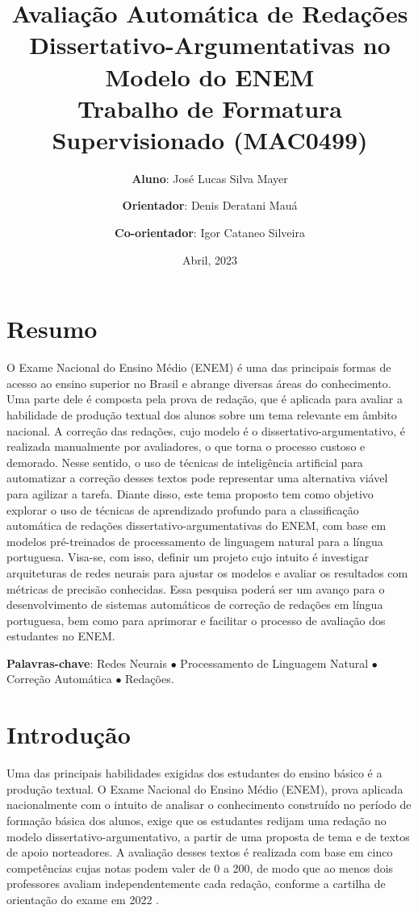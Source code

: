 \documentclass{article}
\title{
    Avaliação Automática de Redações Dissertativo-Argumentativas no Modelo do
    ENEM\\
    \vspace{0.5cm}
    \large Trabalho de Formatura Supervisionado (MAC0499)
}
\author{
    \textbf{Aluno}: José Lucas Silva Mayer
    \and
    \textbf{Orientador}: Denis Deratani Mauá
    \and
    \textbf{Co-orientador}: Igor Cataneo Silveira
}
\date{Abril, 2023}
\begin{document}
\maketitle

\section*{\centering Resumo}

O Exame Nacional do Ensino Médio (ENEM) é uma das principais formas de acesso ao
ensino superior no Brasil e abrange diversas áreas do conhecimento. Uma parte
dele é composta pela prova de redação, que é aplicada para avaliar a habilidade
de produção textual dos alunos sobre um tema relevante em âmbito nacional. A
correção das redações, cujo modelo é o dissertativo-argumentativo, é realizada
manualmente por avaliadores, o que torna o processo custoso e demorado. Nesse
sentido, o uso de técnicas de inteligência artificial para automatizar a
correção desses textos pode representar uma alternativa viável para agilizar a
tarefa. Diante disso, este tema proposto tem como objetivo explorar o uso de
técnicas de aprendizado profundo para a classificação automática de redações
dissertativo-argumentativas do ENEM, com base em modelos pré-treinados de
processamento de linguagem natural para a língua portuguesa. Visa-se, com isso,
definir um projeto cujo intuito é investigar arquiteturas de redes neurais para
ajustar os modelos e avaliar os resultados com métricas de precisão conhecidas.
Essa pesquisa poderá ser um avanço para o desenvolvimento de sistemas
automáticos de correção de redações em língua portuguesa, bem como para
aprimorar e facilitar o processo de avaliação dos estudantes no ENEM.

\vspace{0.3cm}

\noindent \textbf{Palavras-chave}: Redes Neurais $\bullet$ Processamento de
Linguagem Natural $\bullet$ Correção Automática $\bullet$ Redações.

\newpage

\section{Introdução}

Uma das principais habilidades exigidas dos estudantes do ensino básico é a
produção textual. O Exame Nacional do Ensino Médio (ENEM), prova aplicada
nacionalmente com o intuito de analisar o conhecimento construído no período de
formação básica dos alunos, exige que os estudantes redijam uma redação no
modelo dissertativo-argumentativo, a partir de uma proposta de tema e de textos
de apoio norteadores. A avaliação desses textos é realizada com base em cinco
competências cujas notas podem valer de 0 a 200, de modo que ao menos dois
professores avaliam independentemente cada redação, conforme a cartilha de
orientação do exame em 2022 \cite{Cartilha}.
\end{document}

